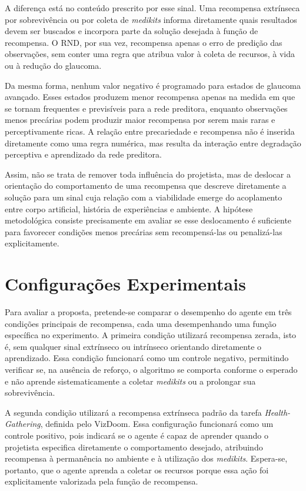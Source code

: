 A diferença está no conteúdo prescrito por esse sinal. Uma recompensa extrínseca por sobrevivência ou por coleta de \textit{medikits} informa diretamente quais resultados devem ser buscados e incorpora parte da solução desejada à função de recompensa. O RND, por sua vez, recompensa apenas o erro de predição das observações, sem conter uma regra que atribua valor à coleta de recursos, à vida ou à redução do glaucoma.

Da mesma forma, nenhum valor negativo é programado para estados de glaucoma avançado. Esses estados produzem menor recompensa apenas na medida em que se tornam frequentes e previsíveis para a rede preditora, enquanto observações menos precárias podem produzir maior recompensa por serem mais raras e perceptivamente ricas. A relação entre precariedade e recompensa não é inserida diretamente como uma regra numérica, mas resulta da interação entre degradação perceptiva e aprendizado da rede preditora.

Assim, não se trata de remover toda influência do projetista, mas de deslocar a orientação do comportamento de uma recompensa que descreve diretamente a solução para um sinal cuja relação com a viabilidade emerge do acoplamento entre corpo artificial, história de experiências e ambiente. A hipótese metodológica consiste precisamente em avaliar se esse deslocamento é suficiente para favorecer condições menos precárias sem recompensá-las ou penalizá-las explicitamente.

\section{Configurações Experimentais}
\label{sec:configuracoes-experimentais}

Para avaliar a proposta, pretende-se comparar o desempenho do agente em três condições principais de recompensa, cada uma desempenhando uma função específica no experimento. A primeira condição utilizará recompensa zerada, isto é, sem qualquer sinal extrínseco ou intrínseco orientando diretamente o aprendizado. Essa condição funcionará como um controle negativo, permitindo verificar se, na ausência de reforço, o algoritmo se comporta conforme o esperado e não aprende sistematicamente a coletar \textit{medikits} ou a prolongar sua sobrevivência.

A segunda condição utilizará a recompensa extrínseca padrão da tarefa \textit{Health-Gathering}, definida pelo VizDoom. Essa configuração funcionará como um controle positivo, pois indicará se o agente é capaz de aprender quando o projetista especifica diretamente o comportamento desejado, atribuindo recompensa à permanência no ambiente e à utilização dos \textit{medikits}. Espera-se, portanto, que o agente aprenda a coletar os recursos porque essa ação foi explicitamente valorizada pela função de recompensa.

